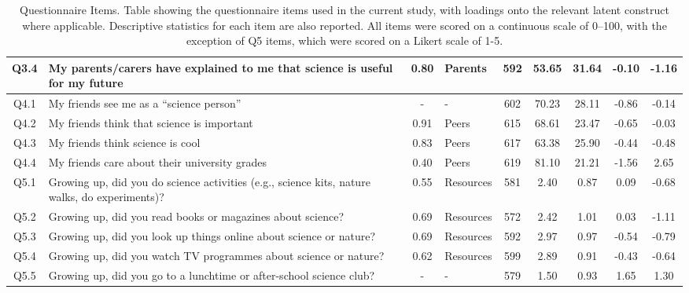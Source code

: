 \begin{landscape}
\begin{table}[ht]
\begin{tabular}[width = \textwidth]{clclccccc}
Q3.4 & \parbox[c]{70mm}{My parents/carers have explained to me that science is useful for my future} & 0.80 & Parents & 592	&53.65	&31.64	& -0.10	&-1.16	\\  
  \hline
Q4.1 & \parbox[c]{70mm}{My friends see me as a ``science person''} & - & - &  602	&70.23&	28.11 &-0.86&-0.14\\
Q4.2 & \parbox[c]{70mm}{My friends think that science is important} & 0.91 & Peers & 615&68.61&	23.47 & -0.65&-0.03 \\
Q4.3 & \parbox[c]{70mm}{My friends think science is cool} & 0.83 & Peers &617&63.38&25.90 & -0.44&-0.48\\ 
Q4.4 & \parbox[c]{70mm}{My friends care about their university grades} & 0.40 & Peers &619&	81.10&	21.21 &-1.56&2.65 \\
  \hline
Q5.1 & \parbox[c]{70mm}{Growing up, did you do science activities (e.g., science kits, nature walks, do experiments)?}  & 0.55 & Resources& 581	&2.40&0.87 & 0.09&-0.68 \\ 
Q5.2 & \parbox[c]{70mm}{Growing up, did you read books or magazines about science?} & 0.69 & Resources &572	&2.42&1.01 & 0.03&-1.11\\
Q5.3 & \parbox[c]{70mm}{Growing up, did you look up things online about science or nature?} & 0.69 & Resources &592&2.97&0.97 &-0.54&-0.79	\\
Q5.4 & \parbox[c]{70mm}{Growing up, did you watch TV programmes about science or nature?} & 0.62 & Resources &599&2.89&0.91 &-0.43&	-0.64\\
Q5.5 & \parbox[c]{70mm}{Growing up, did you go to a lunchtime or after-school science club?} & - &-&579&1.50&0.93 & 1.65&	1.30\\
   \hline
\end{tabular}
\caption{Questionnaire Items. Table showing the questionnaire items used in the current study, with loadings onto the relevant latent construct where applicable. Descriptive statistics for each item are also reported. All items were scored on a continuous scale of 0--100, with the exception of Q5 items, which were scored on a Likert scale of 1-5.} 
\label{tab:ItemMeansSDs}       %
\end{table}
\end{landscape}



